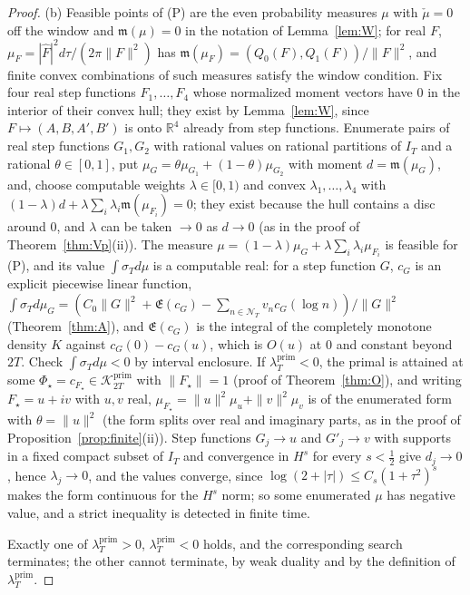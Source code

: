 \documentclass[11pt]{amsart}
\theoremstyle{definition}
\theoremstyle{remark}
\newcommand{\R}{\mathbb R}
\newcommand{\Kp}{\mathcal K^{\mathrm{prim}}_{2T}}
\newcommand{\IT}{I_T}
\newcommand{\lamP}{\lambda^{\mathrm{prim}}_T}
\newcommand{\sT}{\sigma_T}
\newcommand{\Fh}{\widehat F}
\newcommand{\Lev}{\mathfrak E}
\newcommand{\NT}{\mathcal N_T}
\begin{document}
\begin{proof}
(b) Feasible points of \textup{(P)} are the even probability measures $\mu$ with $\check\mu=0$ off the window and
$\mathfrak m(\mu)=0$ in the notation of Lemma~\ref{lem:W}; for real $F$, $\mu_F=|\Fh|^2d\tau/(2\pi\|F\|^2)$ has
$\mathfrak m(\mu_F)=(Q_0(F),Q_1(F))/\|F\|^2$, and finite convex combinations of such measures satisfy the window
condition. Fix four real step functions $F_1,\dots,F_4$ whose normalized moment vectors have $0$ in the interior of
their convex hull; they exist by Lemma~\ref{lem:W}, since $F\mapsto(A,B,A',B')$ is onto $\R^4$ already from step
functions. Enumerate pairs of real step functions $G_1,G_2$ with rational values on rational partitions of $\IT$ and
a rational $\theta\in[0,1]$, put $\mu_G=\theta\mu_{G_1}+(1-\theta)\mu_{G_2}$ with moment $d=\mathfrak m(\mu_G)$, and,
choose computable weights $\lambda\in[0,1)$ and convex $\lambda_1,\dots,\lambda_4$ with
$(1-\lambda)d+\lambda\sum_i\lambda_i\mathfrak m(\mu_{F_i})=0$; they exist because the hull contains a disc around
$0$, and $\lambda$ can be taken $\to0$ as $d\to0$ (as in the proof of Theorem~\ref{thm:Vp}(ii)). The measure $\mu=(1-\lambda)\mu_G+\lambda\sum_i\lambda_i\mu_{F_i}$
is feasible for \textup{(P)}, and its value $\int\sT d\mu$ is a computable real: for a step function $G$, $c_G$ is an
explicit piecewise linear function, $\int\sT d\mu_G=(C_0\|G\|^2+\Lev(c_G)-\sum_{n\in\NT}v_nc_G(\log n))/\|G\|^2$
(Theorem~\ref{thm:A}), and $\Lev(c_G)$ is the integral of the completely monotone density $K$ against $c_G(0)-c_G(u)$,
which is $O(u)$ at $0$ and constant beyond $2T$. Check $\int\sT d\mu<0$ by interval enclosure. If $\lamP<0$, the
primal is attained at some $\Phi_\star=c_{F_\star}\in\Kp$ with $\|F_\star\|=1$ (proof of Theorem~\ref{thm:O}), and
writing $F_\star=u+iv$ with $u,v$ real, $\mu_{F_\star}=\|u\|^2\mu_u+\|v\|^2\mu_v$ is of the enumerated form with
$\theta=\|u\|^2$ (the form splits over real and imaginary parts, as in the proof of Proposition~\ref{prop:finite}(ii)).
Step functions $G_j\to u$ and $G'_j\to v$ with supports in a fixed compact subset of $\IT$ and convergence in
$H^s$ for every $s<\frac12$ give $d_j\to0$, hence $\lambda_j\to0$, and the values converge, since
$\log(2+|\tau|)\le C_s(1+\tau^2)^s$ makes the form continuous for the $H^s$ norm; so some enumerated $\mu$ has
negative value, and a strict inequality is detected in finite time.

Exactly one of $\lamP>0$, $\lamP<0$ holds, and the corresponding search terminates; the other cannot
terminate, by weak duality and by the definition of $\lamP$.
\end{proof}
\end{document}
